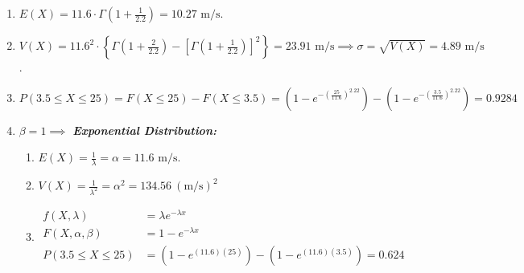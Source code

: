 \documentclass[13pt]{article}
\begin{document}
\begin{enumerate}[label=(\alph*)]
\item $E(X) = 11.6 \cdot \Gamma \left(1 + \frac{1}{2.2}\right) = 10.27 \text{ m/s}.$
\item $V(X) = 11.6^2 \cdot \left\{ \Gamma \left(1 + \frac{2}{2.2}\right)
    - \left[\Gamma \left(1 + \frac{1}{2.2}\right)\right]^2\right\} = 23.91 \text{ m/s}
  \implies \sigma = \sqrt{V(X)} = 4.89 \text{ m/s}$.
\item $P(3.5 \leq X \leq 25) = F(X \leq 25) - F(X \leq 3.5)
  = \left( 1 - e^{- \left( \frac{25}{11.6} \right)^{2.22}} \right)
  - \left( 1 - e^{- \left( \frac{3.5}{11.6} \right)^{2.22}} \right) = 0.9284$
\item $\beta = 1 \implies$ \textit{\textbf{Exponential Distribution:}}
  \begin{enumerate}[label=(\roman*)]
  \item $E(X) = \frac{1}{\lambda} = \alpha = 11.6 \text{ m/s}$.
  \item $V(X) = \frac{1}{\lambda^2} = \alpha^2 = 134.56 \ (\text{m/s})^2$
  \item 
    \begin{align*}
      f(X, \lambda) &= \lambda e^{-\lambda x} \\
      F(X, \alpha, \beta) &= 1 - e^{-\lambda x} \\
      P(3.5 \leq X \leq 25) &= \left(1 - e^{(11.6)(25)}\right) - \left(1 - e^{(11.6)(3.5)}\right) = 0.624
    \end{align*}
  \end{enumerate}
\end{enumerate}
\end{document}
